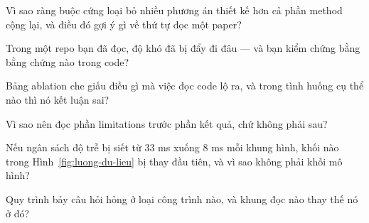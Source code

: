 \documentclass[../../deep_learning.tex]{subfiles}
\begin{document}
\begin{tukiem}
\item Vì sao ràng buộc cứng loại bỏ nhiều phương án thiết kế hơn cả phần method cộng lại, và điều đó gợi ý gì về thứ tự đọc một paper?
\item Trong một repo bạn đã đọc, độ khó đã bị đẩy đi đâu --- và bạn kiểm chứng bằng bằng chứng nào trong code?
\item Bảng ablation che giấu điều gì mà việc đọc code lộ ra, và trong tình huống cụ thể nào thì nó kết luận sai?
\item Vì sao nên đọc phần limitations trước phần kết quả, chứ không phải sau?
\item Nếu ngân sách độ trễ bị siết từ 33 ms xuống 8 ms mỗi khung hình, khối nào trong Hình~\ref{fig:luong-du-lieu} bị thay đầu tiên, và vì sao không phải khối mô hình?
\item Quy trình bảy câu hỏi hỏng ở loại công trình nào, và khung đọc nào thay thế nó ở đó?
\end{tukiem}
\ifSubfilesClassLoaded{\printbibliography[title={Nguồn}]}{}
\end{document}
